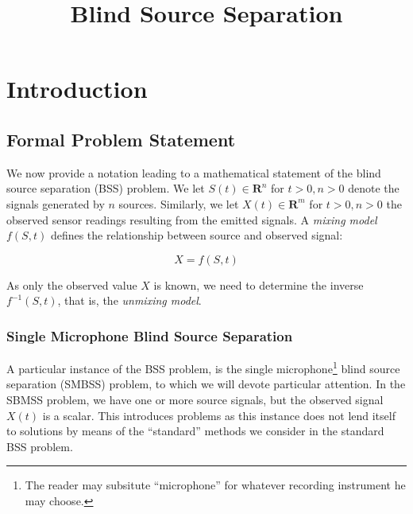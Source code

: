 \message{ !name(main.tex)}\documentclass[]{report}   %
\begin{document}


\title{Blind Source Separation}
\author{}
\date{}    %
\maketitle

\begin{abstract}

\end{abstract}


\chapter{Introduction}

\section{Formal Problem Statement}

We now provide a notation leading to a mathematical statement of the blind source separation (BSS) problem. We let $S(t)\in \mathbf{R}^n$ for $t>0, n>0$ denote the signals generated by $n$ sources. Similarly, we let $X(t)\in \mathbf{R}^m$ for $t>0, n>0$ the observed sensor readings resulting from the emitted signals. A \emph{mixing model} $f(S,t)$ defines the relationship between source and observed signal:

\begin{equation}\label{mixing_model}
  X = f(S,t)
\end{equation}

As only the observed value $X$ is known, we need to determine the inverse $f^{-1}(S,t)$, that is, the \emph{unmixing model}.

\subsection{Single Microphone Blind Source Separation}

A particular instance of the BSS problem, is the single microphone\footnote{The reader may subsitute ``microphone'' for whatever recording instrument he may choose.} blind source separation (SMBSS) problem, to which we will devote particular attention. In the SBMSS problem, we have one or more source signals, but the observed signal $X(t)$ is a scalar. This introduces problems as this instance does not lend itself to solutions by means of the ``standard'' methods we consider in the standard BSS problem.
\end{document}
